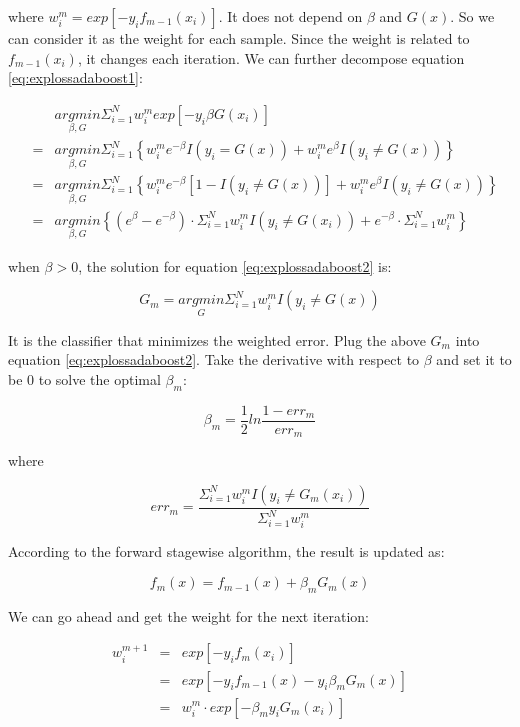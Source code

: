 \documentclass[
  12pt,
]{krantz}
\begin{document}
where \(w_i^m= exp[-y_if_{m-1}(x_i)]\). It does not depend on \(\beta\) and \(G(x)\). So we can consider it as the weight for each sample. Since the weight is related to \(f_{m-1}(x_i)\), it changes each iteration. We can further decompose equation \eqref{eq:explossadaboost1}:

\begin{equation}
\begin{array}{ccc}
 &  & \underset{\beta,G}{argmin}\Sigma_{i=1}^{N}w_{i}^{m}exp[-y_{i}\beta G(x_{i})]\\
 & = & \underset{\beta,G}{argmin}\Sigma_{i=1}^{N}\left\{ w_{i}^{m}e^{-\beta}I(y_{i}=G(x))+w_{i}^{m}e^{\beta}I(y_{i}\neq G(x))\right\} \\
 & = & \underset{\beta,G}{argmin}\Sigma_{i=1}^{N}\left\{ w_{i}^{m}e^{-\beta}[1-I(y_{i}\neq G(x))]+w_{i}^{m}e^{\beta}I(y_{i}\neq G(x))\right\} \\
 & = & \underset{\beta,G}{argmin}\left\{ (e^{\beta}-e^{-\beta})\cdot\Sigma_{i=1}^{N}w_{i}^{m}I(y_{i}\neq G(x_{i}))+e^{-\beta}\cdot\Sigma_{i=1}^{N}w_{i}^{m}\right\} 
\end{array}
\label{eq:explossadaboost2}
\end{equation}

when \(\beta >0\), the solution for equation \eqref{eq:explossadaboost2} is:

\[G_{m} = \underset{G}{argmin}\Sigma_{i=1}^{N}w_{i}^{m}I(y_{i}\neq G(x))\]

It is the classifier that minimizes the weighted error. Plug the above \(G_m\) into equation \eqref{eq:explossadaboost2}. Take the derivative with respect to \(\beta\) and set it to be 0 to solve the optimal \(\beta_m\):

\[\beta_m =\frac{1}{2}ln\frac{1-err_m}{err_m}\]

where

\[err_m = \frac{\Sigma_{i=1}^N w_i^{m}I(y_i \neq G_m(x_i))}{\Sigma_{i=1}^N w_i^{m}}\]

According to the forward stagewise algorithm, the result is updated as:

\[f_m(x)=f_{m-1}(x)+\beta_m G_m(x)\]

We can go ahead and get the weight for the next iteration:

\begin{equation}
\begin{array}{ccc}
w_i^{m+1} & = & exp[-y_if_m (x_i)]\\
& = & exp[-y_if_{m-1}(x)-y_i \beta_m G_m(x)]\\
& = & w_{i}^{m}\cdot exp[-\beta_m y_i G_m(x_i)]
\end{array}
\label{eq:explossadaboost3}
\end{equation}
\end{document}
